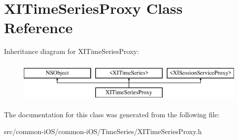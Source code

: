 \hypertarget{interface_x_i_time_series_proxy}{}\section{X\+I\+Time\+Series\+Proxy Class Reference}
\label{interface_x_i_time_series_proxy}
Inheritance diagram for X\+I\+Time\+Series\+Proxy\+:\begin{figure}[H]
\begin{center}
\leavevmode
\includegraphics[height=2.000000cm]{interface_x_i_time_series_proxy}
\end{center}
\end{figure}


The documentation for this class was generated from the following file\+:\begin{DoxyCompactItemize}
\item 
src/common-\/i\+O\+S/common-\/i\+O\+S/\+Time\+Series/X\+I\+Time\+Series\+Proxy.\+h\end{DoxyCompactItemize}
